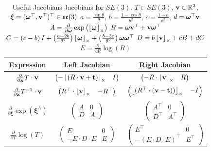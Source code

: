 \begin{table}[ht]
\caption{Useful Jacobians Jacobians for $SE(3)$. \newline
         $T\in SE(3)$, $\mathbf{v}\in\mathbb{R}^{3}$, \newline
         $\boldsymbol{\xi}=(\boldsymbol{\omega}^\top, \mathbf{v}^\top)^\top \in\mathfrak{se}(3)$\newline
         $a=\frac{\sin\theta}{\theta}$, $b=\frac{1-\cos\theta}{\theta^{2}}$, \newline 
         $c=\frac{1-a}{\theta^{2}}$, $d=\boldsymbol{\omega}^{\top}\mathbf{v}$ \newline
         $A=\frac{\partial}{\partial\boldsymbol{\omega}}\exp\left(\left\lfloor\boldsymbol{\omega}\right\rfloor_{\times}\right)$ \newline
		 $B=\boldsymbol{\omega}\mathbf{v}^{\top}+\mathbf{v}\boldsymbol{\omega}^{\top}$ \newline
		 $C=\left(c-b\right)I+\left(\frac{a-2b}{\theta^{2}}\right)\left\lfloor\boldsymbol{\omega}\right\rfloor_{\times}+\left(\frac{b-3c}{\theta^{2}}\right)\boldsymbol{\omega}\boldsymbol{\omega}^{\top}$ \newline
		 $D=b\left\lfloor\mathbf{v}\right\rfloor_{\times}+cB+dC$ \newline
		 $E=\frac{\partial}{\partial R}\log\left(R\right)$
         }
\label{tab:lie_identities_group_vector-se3}
\bgroup
\def\arraystretch{2.0}
\begin{tabular}{ccc}
	\toprule
	Expression & Left Jacobian & Right Jacobian\\
	\midrule 
	$\frac{\partial}{\partial\mathbf{x}}T\cdot\mathbf{v}$ & $\begin{pmatrix}-\left\lfloor(R\cdot\mathbf{v}+\mathbf{t})\right\rfloor_{\times} & I\end{pmatrix}$ & $\begin{pmatrix}-R\cdot\left\lfloor\mathbf{v}\right\rfloor_{\times} & R\end{pmatrix}$\\
	$\frac{\partial}{\partial\mathbf{x}}T^{-1}\cdot\mathbf{v}$ & $\begin{pmatrix}R^{\top}\cdot\left\lfloor\mathbf{v}\right\rfloor_{\times} & -R^{\top}\end{pmatrix}$ & $\begin{pmatrix}\left\lfloor(R^{\top}\cdot\left(\mathbf{v}-\mathbf{t}\right))\right\rfloor_{\times} & -I\end{pmatrix}$\\
	$\frac{\partial}{\partial\boldsymbol{\xi}}\exp\left(\boldsymbol{\xi}^{\wedge}\right)$ & $\begin{pmatrix}A & 0\\
	D & A
	\end{pmatrix}$ & $\begin{pmatrix}A^{\top} & 0\\
	D^{\top} & A^{\top}
	\end{pmatrix}$\\
	$\frac{\partial}{\partial T}\log\left(T\right)$ & $\begin{pmatrix}E & 0\\
	-E\cdot D\cdot E & E
	\end{pmatrix}$ & $\begin{pmatrix}E^{\top} & 0\\
	-\left(E\cdot D\cdot E\right)^{\top} & E^{\top}
	\end{pmatrix}$\\
	\bottomrule
\end{tabular}
\egroup
\end{table}

